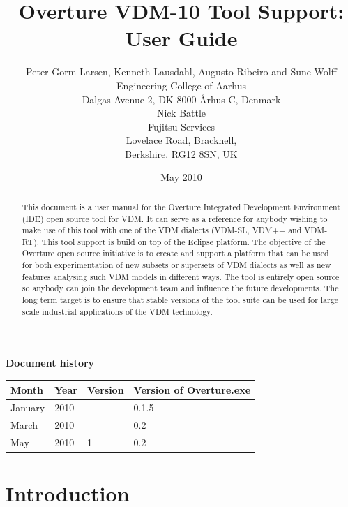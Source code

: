 \documentclass{overturerepsec}
\begin{document}
\title{Overture VDM-10 Tool Support: User Guide}
\author{Peter Gorm Larsen, Kenneth Lausdahl, Augusto Ribeiro and Sune Wolff \\ 
Engineering College of Aarhus\\
Dalgas Avenue 2, DK-8000 \AA{}rhus C, Denmark\\[3mm]
Nick Battle\\
Fujitsu Services\\
Lovelace Road, Bracknell, \\
Berkshire. RG12 8SN, UK}

\date{May 2010}


\maketitle


\textbf{Document history}

\begin{tabular}{|l|l|l|l|}\hline
Month   & Year & Version & Version of Overture.exe \\ \hline
January & 2010 &         & 0.1.5 \\ \hline
March   & 2010 &         & 0.2   \\ \hline
May     & 2010 & 1       & 0.2   \\ \hline
\end{tabular}

\tableofcontents

\begin{abstract}
This document is a user manual for the Overture Integrated Development
Environment (IDE) open source tool for
VDM. It can serve as a reference for anybody wishing to make use of
this tool with one of the VDM dialects (VDM-SL, VDM++ and VDM-RT).
This tool support is build on top of the Eclipse platform. The
objective of the Overture open source initiative is to create and support a
platform that can be used for both experimentation of new subsets or
supersets of VDM dialects as well as new features analysing such VDM
models in different ways. The tool is entirely open source so anybody
can join the development team and influence the future
developments. The long term target is to ensure that stable
versions of the tool suite can be used for large scale industrial
applications of the VDM technology.
\end{abstract}

\section{Introduction}
\end{document}
